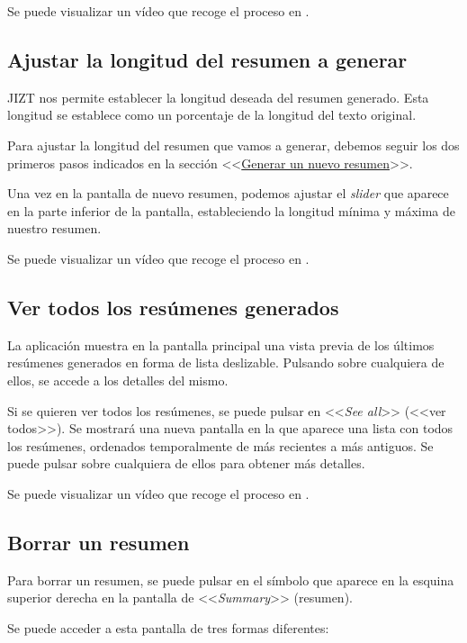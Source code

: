 Se puede visualizar un vídeo que recoge el proceso en \href{}{}.

\subsection{Ajustar la longitud del resumen a generar}

JIZT nos permite establecer la longitud deseada del resumen generado. Esta longitud se establece como un porcentaje de la longitud del texto original.

Para ajustar la longitud del resumen que vamos a generar, debemos seguir los dos primeros pasos indicados en la sección <<\hyperref[subsection:nuevo-resumen]{Generar un nuevo resumen}>>.

Una vez en la pantalla de nuevo resumen, podemos ajustar el \emph{slider} que aparece en la parte inferior de la pantalla, estableciendo la longitud mínima y máxima de nuestro resumen.

Se puede visualizar un vídeo que recoge el proceso en \href{}{}.

\subsection{Ver todos los resúmenes generados}

La aplicación muestra en la pantalla principal una vista previa de los últimos resúmenes generados en forma de lista deslizable. Pulsando sobre cualquiera de ellos, se accede a los detalles del mismo.

Si se quieren ver todos los resúmenes, se puede pulsar en <<\emph{See all}>> (<<ver todos>>). Se mostrará una nueva pantalla en la que aparece una lista con todos los resúmenes, ordenados temporalmente de más recientes a más antiguos. Se puede pulsar sobre cualquiera de ellos para obtener más detalles.

Se puede visualizar un vídeo que recoge el proceso en \href{}{}.

\subsection{Borrar un resumen} \label{subsection:borrar}

Para borrar un resumen, se puede pulsar en el símbolo que aparece en la esquina superior derecha en la pantalla de <<\emph{Summary}>> (resumen).

Se puede acceder a esta pantalla de tres formas diferentes:

